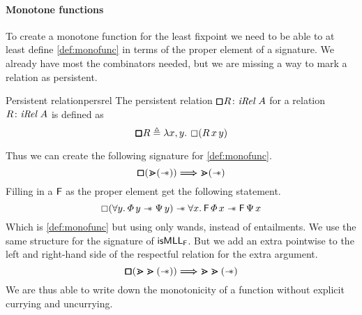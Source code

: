 \documentclass[thesis.tex]{subfiles}
\begin{document}
\paragraph*{Monotone functions}
To create a monotone function for the least fixpoint we need to be able to at least define \cref{def:monofunc} in terms of the proper element of a signature. We already have most the combinators needed, but we are missing a way to mark a relation as persistent.
\begin{definition}{Persistent relation}{persrel}
  The persistent relation $\persrel\rel\colon\Rel\ \sigax$ for a relation $\rel\colon\Rel\ \sigax$ is defined as
  \[\persrel\rel \eqdef \Lam\var,\varB. \always (\rel\,\var\,\varB)\]
\end{definition}
Thus we can create the following signature for \cref{def:monofunc}.
\[\pmb{\mathop{\boxempty}} (\bm{\gtrdot} (\mathrel{-\!\!\ast})) \mathrel{\bm{\Longrightarrow}} \bm{\gtrdot} (\mathrel{-\!\!\ast})\]
Filling in a $\textsf{\upshape F}$ as the proper element get the following statement.
\[ \always(\All \varB. \pred\,\varB \wand \predB\,\varB) \wand \All \var. \hopred\,\pred\,\var \wand \hopred\,\predB\,\var \]
Which is \cref{def:monofunc} but using only wands, instead of entailments. We use the same structure for the signature of $\textsf{\upshape isMLL}_{\textsf{\upshape F}}$. But we add an extra pointwise to the left and right-hand side of the respectful relation for the extra argument.
\[\pmb{\mathop{\boxempty}} (\bm{\gtrdot}\bm{\gtrdot} (\mathrel{-\!\!\ast})) \mathrel{\bm{\Longrightarrow}} \bm{\gtrdot}\bm{\gtrdot} (\mathrel{-\!\!\ast})\]
We are thus able to write down the monotonicity of a function without explicit currying and uncurrying.
\end{document}

